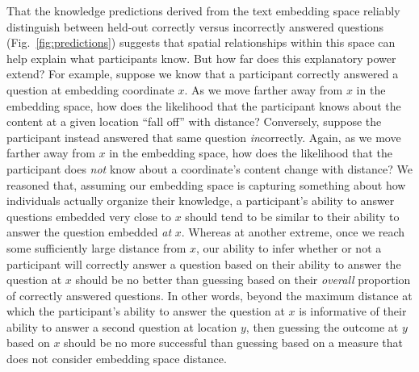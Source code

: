 \documentclass[10pt]{article}
\providecommand{\DIFaddend}{} %
\DeclareRobustCommand{\DIFaddend}{\DIFOaddend \let\includegraphics\DIFOincludegraphics} %
\begin{document}
\DIFaddend That the knowledge predictions derived from the text embedding space reliably
distinguish between held-out correctly versus incorrectly answered questions
(Fig.~\ref{fig:predictions}) suggests that spatial relationships within this
space can help explain what participants know. But how far does this
explanatory power extend? For example, suppose we know that a participant
correctly answered a question at embedding coordinate $x$. As we move farther
away from $x$ in the embedding space, how does the likelihood that the
participant knows about the content at a given location ``fall off'' with
distance? Conversely, suppose the participant instead answered that same
question \textit{in}correctly. Again, as we move farther away from $x$ in the
embedding space, how does the likelihood that the participant does \textit{not}
know about a coordinate's content change with distance? We reasoned that,
assuming our embedding space is capturing something about how individuals
actually organize their knowledge, a participant's ability to answer questions
embedded very close to $x$ should tend to be similar to their ability to answer
the question embedded \textit{at} $x$. Whereas at another extreme, once we
reach some sufficiently large distance from $x$, our ability to infer whether
or not a participant will correctly answer a question based on their ability to
answer the question at $x$ should be no better than guessing based on their
\textit{overall} proportion of correctly answered questions. In other words,
beyond the maximum distance at which the participant's ability to answer the
question at $x$ is informative of their ability to answer a second question at
location $y$, then guessing the outcome at $y$ based on $x$ should be no more
successful than guessing based on a measure that does not consider embedding
space distance.
\end{document}
